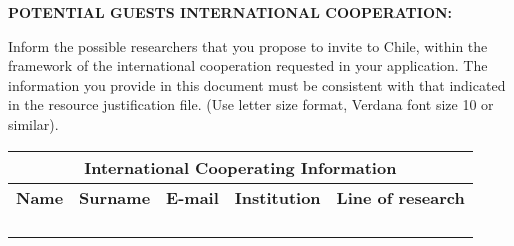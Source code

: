 \documentclass[MAIN.tex]{subfiles}
\begin{document}
\noindent\textbf{POTENTIAL GUESTS INTERNATIONAL COOPERATION:}

\noindent Inform the possible researchers that you propose to invite
to Chile, within the framework of the international cooperation
requested in your application. The information you provide in this
document must be consistent with that indicated in the resource
justification file. (Use letter size format, Verdana font size 10 or
similar).

\bigskip

\noindent\begin{tabularx}{\linewidth}{|X|X|X|X|X|}
\hline
\multicolumn{5}{|c|}{\cellcolor{tcc}\textbf{International Cooperating Information}}
\tabularnewline
\hline
\cellcolor{tcc}\centering\small\textbf{Name}
& \cellcolor{tcc}\centering\small\textbf{Surname}
& \cellcolor{tcc}\centering\small\textbf{E-mail}
& \cellcolor{tcc}\centering\small\textbf{Institution}
& \cellcolor{tcc}\centering\small\textbf{Line of research}
\tabularnewline
\hline
& & & & \\\hline
& & & & \\\hline
& & & & \\\hline
 & & & & \\\hline
\end{tabularx}
\end{document}
